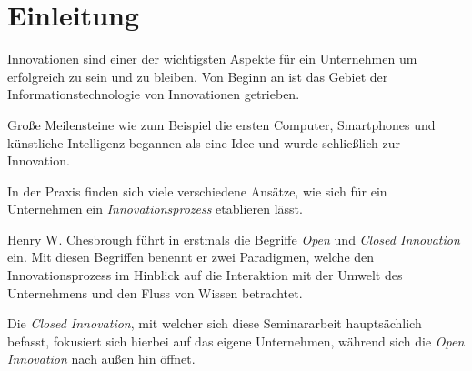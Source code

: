 \section{Einleitung}\label{sec:einleitung}

Innovationen sind einer der wichtigsten Aspekte für ein Unternehmen um erfolgreich zu sein und zu bleiben.
Von Beginn an ist das Gebiet der Informationstechnologie von Innovationen getrieben.

Große Meilensteine wie zum Beispiel die ersten Computer, Smartphones
und künstliche Intelligenz begannen als eine Idee und wurde schließlich zur Innovation.

In der Praxis finden sich viele verschiedene Ansätze,
wie sich für ein Unternehmen ein \textit{Innovationsprozess} etablieren lässt.

Henry W. Chesbrough führt in \cite{chesbrough2003} erstmals die Begriffe \textit{Open} und
\textit{Closed Innovation} ein.
Mit diesen Begriffen benennt er zwei Paradigmen, welche den Innovationsprozess im Hinblick auf die
Interaktion mit der Umwelt des Unternehmens und den Fluss von Wissen betrachtet.

Die \textit{Closed Innovation}, mit welcher sich diese Seminararbeit hauptsächlich befasst,
fokusiert sich hierbei auf das eigene Unternehmen, während sich die \textit{Open Innovation}
nach außen hin öffnet.